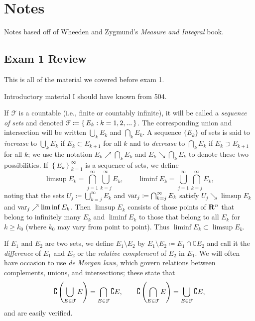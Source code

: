 \chapter{Notes}
Notes based off of Wheeden and Zygmund's \emph{Measure and Integral} book.
\section{Exam 1 Review}
This is all of the material we covered before exam 1.

\bigskip

Introductory material I should have known from 504.

If $\mathcal{F}$ is a countable (i.e., finite or countably infinite), it will be
called a \emph{sequence of sets} and denoted
$\mathcal{F}\coloneqq\left\{\,E_k:k=1,2,...\,\right\}$. The corresponding union
and intersection will be written $\bigcup_k E_k$ and $\bigcap_k E_k$. A
sequence $\{E_k\}$ of sets is said to \emph{increase} to $\bigcup_k E_k$ if
$E_k\subset E_{k+1}$ for all $k$ and to \emph{decrease} to $\bigcap_k E_k$
if $E_k\supset E_{k+1}$ for all $k$; we use the notation
$E_k\nearrow\bigcap_k E_k$ and $E_k\searrow\bigcap_k E_k$ to denote these
two possibilities. If $\left\{E_k\right\}_{k=1}^\infty$ is a sequence of
sets, we define
\begin{equation}
\label{eq:limsup-liminf-sets}
\limsup E_k=\bigcap_{j=1}^\infty\bigcup_{k=j}^\infty E_k,\qquad
\liminf E_k=\bigcup_{j=1}^\infty\bigcap_{k=j}^\infty E_k,
\end{equation}
noting that the sets $U_j\coloneqq\bigcup_{k=j}^\infty E_k$ and
$\operatorname{var}_j\coloneqq\bigcap_{k=j}^\infty E_k$ satisfy $U_j\searrow\limsup E_k$ and
$\operatorname{var}_j\nearrow\liminf E_k$. Then $\limsup E_k$ consists of those points of
$\mathbf{R}^n$ that belong to infinitely many $E_k$ and $\liminf E_k$ to those
that belong to all $E_k$ for $k\geq k_0$ (where $k_0$ may vary from point
to point). Thus $\liminf E_k\subset\limsup E_k$.

If $E_1$ and $E_2$ are two sets, we define $E_1\setminus E_2$ by
$E_1\setminus E_2\coloneqq E_1\cap\complement E_2$ and call it the
\emph{difference} of $E_1$ and $E_2$ or the \emph{relative complement} of
$E_2$ in $E_1$. We will often have occasion to use \emph{de Morgan laws},
which govern relations between complements, unions, and intersections;
these state that
\begin{equation}
\label{eq:de-morgan-laws}
\complement
\left(\bigcup_{E\in\mathcal{F}}E\right)=
\bigcap_{E\in\mathcal{F}}\complement E,\qquad
\complement
\left(\bigcap_{E\in\mathcal{F}}E\right)=
\bigcup_{E\in\mathcal{F}}\complement E,
\end{equation}
and are easily verified.

